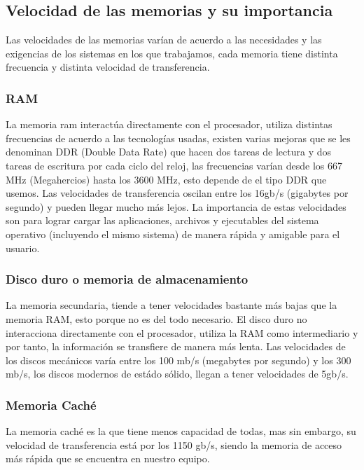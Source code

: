 \documentclass{article}
\begin{document}
\subsection{Velocidad de las memorias y su importancia}
Las velocidades de las memorias varían de acuerdo a las necesidades y las exigencias de los sistemas en los que trabajamos, cada memoria tiene distinta frecuencia y distinta velocidad de transferencia.
\subsubsection{RAM}
La memoria ram interactúa directamente con el procesador, utiliza distintas frecuencias de acuerdo a las tecnologías usadas, existen varias mejoras que se les denominan DDR (Double Data Rate) que hacen dos tareas de lectura y dos tareas de escritura por cada ciclo del reloj, las frecuencias varían desde los 667 MHz (Megahercios) hasta los 3600 MHz, esto depende de el tipo DDR que usemos. Las velocidades de transferencia oscilan entre los 16gb/s (gigabytes por segundo) y pueden llegar mucho más lejos. La importancia de estas velocidades son para lograr cargar las aplicaciones, archivos y ejecutables del sistema operativo (incluyendo el mismo sistema) de manera rápida y amigable para el usuario.\cite{velocidadram}
\subsubsection{Disco duro o memoria de almacenamiento}
La memoria secundaria, tiende a tener velocidades bastante más bajas que la memoria RAM, esto porque no es del todo necesario. El disco duro no interacciona directamente con el procesador, utiliza la RAM como intermediario y por tanto, la información se transfiere de manera más lenta. Las velocidades de los discos mecánicos varía entre los 100 mb/s (megabytes por segundo) y los 300 mb/s, los discos modernos de estádo sólido, llegan a tener velocidades de 5gb/s.\cite{DiscoDuro}
\subsubsection{Memoria Caché}
La memoria caché es la que tiene menos capacidad de todas, mas sin embargo, su velocidad de transferencia está por los 1150 gb/s, siendo la memoria de acceso más rápida que se encuentra en nuestro equipo.\cite{cache}

\vspace{1.5cm}
\end{document}
